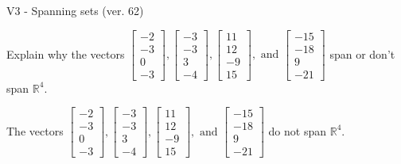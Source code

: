 \begin{exercise}
  \begin{exerciseTitle}V3 - Spanning sets (ver. 62)\end{exerciseTitle}
  \begin{exerciseStatement}
    Explain why the vectors \(\left[\begin{array}{r}
-2 \\
-3 \\
0 \\
-3
\end{array}\right] , \left[\begin{array}{r}
-3 \\
-3 \\
3 \\
-4
\end{array}\right] , \left[\begin{array}{r}
11 \\
12 \\
-9 \\
15
\end{array}\right] , \text{ and } \left[\begin{array}{r}
-15 \\
-18 \\
9 \\
-21
\end{array}\right]\) span or don't span \(\mathbb{R}^4\). 
	


  \end{exerciseStatement}
  \begin{exerciseAnswer}
   The vectors \(\left[\begin{array}{r}
-2 \\
-3 \\
0 \\
-3
\end{array}\right] , \left[\begin{array}{r}
-3 \\
-3 \\
3 \\
-4
\end{array}\right] , \left[\begin{array}{r}
11 \\
12 \\
-9 \\
15
\end{array}\right] , \text{ and } \left[\begin{array}{r}
-15 \\
-18 \\
9 \\
-21
\end{array}\right]\) 
  	 do not  
	span \(\mathbb{R}^4\).
  


  \end{exerciseAnswer}
\end{exercise}